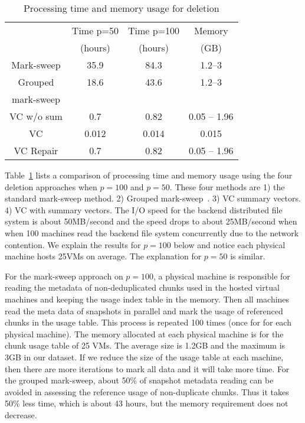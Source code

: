 

\begin{table}[htb]
\centering
\begin{tabular}{|c|c|c|c|}
    \hline 
	    &Time p=50 & Time p=100 & Memory \\
	    &(hours)  & (hours) & (GB) \\
\hline
Mark-sweep  & 35.9  &  84.3  & 1.2--3 \\
\hline
Grouped &     18.6    & 43.6   & 1.2--3 \\
mark-sweep &        &    &  \\
\hline
VC w/o sum &  0.7     & 0.82   & 0.05 -- 1.96 \\
\hline
VC  &  0.012      & 0.014   & 0.015  \\
\hline
VC Repair  &  0.7      & 0.82   & 0.05 -- 1.96 \\
\hline
    \end{tabular}
    \caption{ Processing time and memory usage  for
deletion}  
    \label{tab:deletion-cmp}
\end{table}

Table~\ref{tab:deletion-cmp}   lists a comparison of processing time and memory usage
using the four deletion approaches when $p=100$ and $p=50$. These four 
methods are 1) the standard mark-sweep method. 2) Grouped mark-sweep~\cite{Guo2011}. 
3)   VC summary vectors. 4) VC with summary vectors.
The I/O speed for the backend distributed file system is about 50MB/second
and the speed drops to about 25MB/second when
when 100 machines read the backend file system concurrently due to the network
contention. We explain the results for $p=100$ below and notice each physical machine hosts 25VMs on average. The explanation for $p=50$ is similar.

For the mark-sweep approach on $p=100$, a physical machine is responsible for
reading the metadata of non-deduplicated chunks used in the hosted 
virtual machines and keeping the usage index table in the memory.
Then all machines read the meta data 
of snapshots in parallel and mark the usage of referenced chunks
in the usage table.
This process is repeated 100 times (once for for each physical machine).
The memory allocated at each physical machine is for the 
chunk usage table of 25 VMs. The average size is 1.2GB and the maximum is
3GB in our dataset. If we reduce the size of  the usage table at each machine, 
then there are more iterations to mark all data and it 
will take more time.    
For the grouped mark-sweep, about 50\% of snapshot metadata reading can be 
avoided in assessing the reference usage of non-duplicate chunks. 
Thus it takes 50\% less time, which is about 43 hours, but the 
memory requirement does not decrease.

